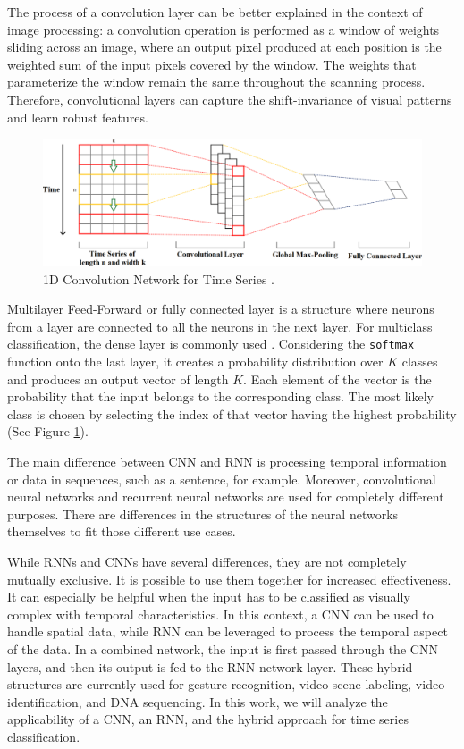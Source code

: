 The process of a convolution layer can be better explained in the context of image processing: a convolution operation is performed as a window of weights sliding across an image, where an output pixel produced at each position is the weighted sum of the input pixels covered by the window. The weights that parameterize the window remain the same throughout the scanning process. Therefore, convolutional layers can capture the shift-invariance of visual patterns and learn robust features.

\begin{figure}[htb]
	\centering
	\includegraphics[scale=0.26]{../Figures/1d-cnn}
	\caption{1D Convolution Network for Time Series \cite{Kim2014}.}
	\label{Fig:1DCNN}
\end{figure}

Multilayer Feed-Forward or fully connected layer is a structure where neurons from a layer are connected to all the neurons in the next layer. For multiclass classification, the dense layer is commonly used \cite{Albawi2017}. Considering the \texttt{softmax} function onto the last layer, it creates a probability distribution over $K$ classes and produces an output vector of length $K$. Each element of the vector is the probability that the input belongs to the corresponding class. The most likely class is chosen by selecting the index of that vector having the highest probability (See Figure \ref{Fig:1DCNN}).

The main difference between CNN and RNN is processing temporal information or data in sequences, such as a sentence, for example. Moreover, convolutional neural networks and recurrent neural networks are used for completely different purposes. There are differences in the structures of the neural networks themselves to fit those different use cases.  

While RNNs and CNNs have several differences, they are not completely mutually exclusive. It is possible to use them together for increased effectiveness. It can especially be helpful when the input has to be classified as visually complex with temporal characteristics. In this context, a CNN can be used to handle spatial data, while RNN can be leveraged to process the temporal aspect of the data. In a combined network, the input is first passed through the CNN layers, and then its output is fed to the RNN network layer. These hybrid structures are currently used for gesture recognition, video scene labeling, video identification, and DNA sequencing. In this work, we will analyze the applicability of a CNN, an RNN, and the hybrid approach for time series classification.

